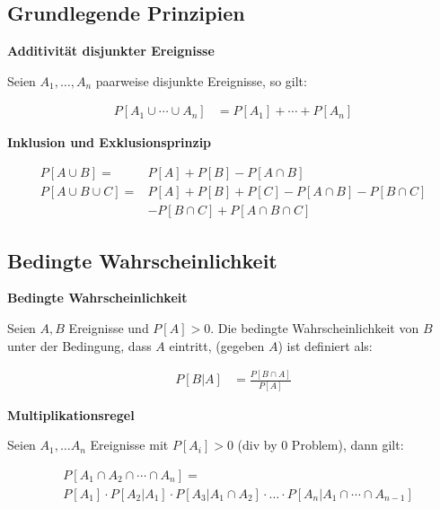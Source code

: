 \documentclass[25pt]{sciposter}
\newenvironment{method}[1]{\begin{mdframed}[backgroundcolor=blue!10,innertopmargin=15pt, innerbottommargin=15pt,nobreak=true]
		\textbf{#1 }
	}
	{ 
	\end{mdframed}
}
\newenvironment{thm}[1]{\begin{mdframed}[backgroundcolor=pink!20,innertopmargin=15pt, innerbottommargin=15pt, nobreak=true]
		\textbf{#1 }
	}
	{ 
	\end{mdframed}
}
\begin{document}
\begin{multicols}{3}
		
		
		\subsection*{Grundlegende Prinzipien}
		
		
		
		\begin{thm}{Additivität disjunkter Ereignisse}
			Seien $A_1, \ldots, A_n$ paarweise disjunkte Ereignisse, so gilt:
			
			\begin{align*}
				P[A_1\cup \cdots \cup A_n] &= P[A_1] + \cdots + P[A_n]
			\end{align*}
			
		\end{thm}
		
		\begin{thm}{Inklusion und Exklusionsprinzip}
			\begin{align*}
				P[A\cup B] =& P[A] + P[B] - P[A\cap B]\\
				P[A\cup B\cup C] =& P[A] + P[B] + P[C] - P[A\cap B] - P[B\cap C] \\
				&- P[B\cap C] + P[A\cap B \cap C]
			\end{align*}
		\end{thm}
		
		
		
		\subsection*{Bedingte Wahrscheinlichkeit}
		
		\begin{method}{Bedingte Wahrscheinlichkeit}
			Seien $A, B$ Ereignisse und $P[A] > 0$. Die bedingte Wahrscheinlichkeit von $B$ unter der Bedingung, dass $A$ eintritt, (gegeben $A$) ist definiert als:
			
			\begin{align*}
				P[B|A] &= \frac{P[B \cap A]}{P[A]}
			\end{align*}
			
		\end{method}
		
		\begin{thm}{Multiplikationsregel}
			Seien $A_1,\ldots A_n$ Ereignisse mit $P[A_i]>0$ (div by $0$ Problem), dann gilt:
			
			\begin{align*}
				&P[A_1 \cap A_2 \cap \cdots \cap A_n] = \\
				&P[A_1] \cdot P[A_2 | A_1] \cdot P[A_3|A_1 \cap A_2] \cdot \ldots \cdot P[A_n | A_1 \cap \cdots \cap A_{n-1}]
			\end{align*}
		\end{thm}
		

\end{multicols}
\end{document}
